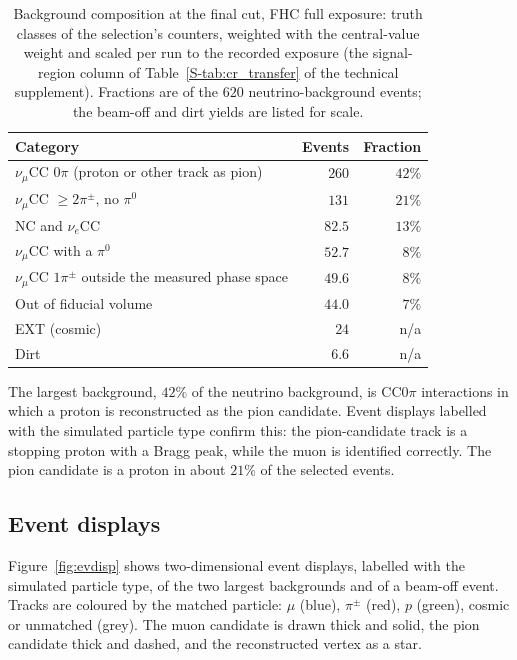 \documentclass[11pt,a4paper]{article}
\newcommand{\suppref}[2]{#1~\ref{S-#2} of the technical supplement}
\begin{document}
\begin{table}[H]
  \centering
  \caption{Background composition at the final cut, FHC full exposure: truth classes of the
    selection's counters, weighted with the central-value weight and scaled per run to the recorded
    exposure (the signal-region column of \suppref{Table}{tab:cr_transfer}). Fractions are of the
    $620$ neutrino-background events; the beam-off and dirt yields are listed for scale.}
  \label{tab:bkgcomp}
  \begin{tabular}{lrr}
    \toprule
    Category & Events & Fraction \\
    \midrule
    $\nu_\mu$CC $0\pi$ (proton or other track as pion) & $260$ & $42\%$ \\
    $\nu_\mu$CC $\geq2\pi^\pm$, no $\pi^0$             & $131$ & $21\%$ \\
    NC and $\nu_e$CC                                   & $82.5$ & $13\%$ \\
    $\nu_\mu$CC with a $\pi^0$                         & $52.7$ & $8\%$ \\
    $\nu_\mu$CC $1\pi^\pm$ outside the measured phase space & $49.6$ & $8\%$ \\
    Out of fiducial volume                             & $44.0$ & $7\%$ \\
    EXT (cosmic)                                      & $24$ & n/a \\
    Dirt                                              & $6.6$ & n/a \\
    \bottomrule
  \end{tabular}
\end{table}

The largest background, $42\%$ of the neutrino background, is CC$0\pi$ interactions in which a
proton is reconstructed as the pion candidate. Event displays labelled with the simulated particle
type confirm this: the pion-candidate track is a stopping proton with a Bragg peak, while the muon
is identified correctly. The pion candidate is a proton in about $21\%$ of the selected events.

\subsection{Event displays}

Figure~\ref{fig:evdisp} shows two-dimensional event displays, labelled with the simulated particle
type, of the two largest backgrounds and of a beam-off event. Tracks are coloured by the matched
particle: $\mu$ (blue), $\pi^\pm$ (red), $p$ (green), cosmic or unmatched (grey). The muon
candidate is drawn thick and solid, the pion candidate thick and dashed, and the reconstructed
vertex as a star.
\end{document}

